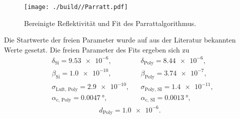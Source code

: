 \begin{figure}[H]
    \centering
    \texttt{[image: ./build//Parratt.pdf]}
    \caption{Bereinigte Reflektivität und Fit des Parrattalgorithmus.}
    \label{fig:Reflektivität3}
\end{figure}
\noindent
Die Startwerte der freien Parameter wurde auf aus der Literatur bekannten Werte gesetzt.
Die freien Parameter des Fits ergeben sich zu
\begin{align*}
    &\delta_{\text{Si}} = \SI{9.53e-6}, & & \delta_{\text{Poly}} = \SI{8.44e-6}, \\
    &\beta_{\text{Si}} = \SI{1.0e-10}, & &\beta_{\text{Poly}} = \SI{3.74e-7}, \\
    &\sigma_{\text{Luft, Poly}} = \SI{2.9e-10}, & & \sigma_{\text{Poly, SI}} = \SI{1.4e-11}, \\
    &\alpha_{\text{c, Poly}} = \SI{0.0047}{\degree}, & & \alpha_{\text{c, SI}} = \SI{0.0013}{\degree}, 
\end{align*}
\begin{align*}
    d_{\text{Poly}} = \SI{1.0e-6}.
\end{align*}